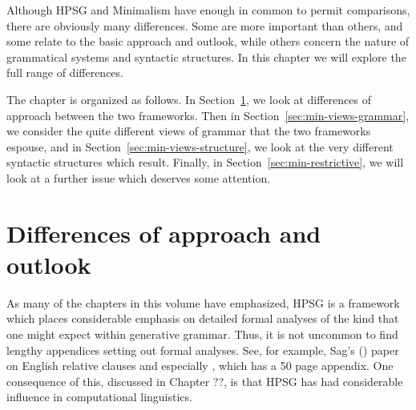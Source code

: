 \documentclass[output=paper]{langsci/langscibook}
\begin{document}
Although HPSG and Minimalism have enough in common to permit comparisons, there are obviously many differences. Some are more important than others, and some relate to the basic approach and outlook, while others concern the nature of grammatical systems and syntactic structures. In this chapter we will explore the full range of differences.

The chapter is organized as follows. In Section~\ref{sec:min-difference}, we look at differences of approach between the two frameworks. Then in Section~\ref{sec:min-views-grammar}, we consider the quite different views of grammar that the two frameworks espouse, and in Section~\ref{sec:min-views-structure}, we look at the very different syntactic structures which result. Finally, in Section~\ref{sec:min-restrictive}, we will look at a further issue which deserves some attention.

\section{Differences of approach and outlook}
\label{sec:min-difference}
As many of the chapters in this volume have emphasized, HPSG is a framework which places considerable emphasis on detailed formal analyses of the kind that one might expect within generative grammar. Thus, it is not uncommon to find lengthy appendices setting out formal analyses. See, for example, Sag's (\citeyear{Sag97a}) paper on English relative clauses and especially \citet{GSag2000a-u}, which has a 50 page appendix. One consequence of this, discussed in Chapter ??, is that HPSG has had considerable influence in computational linguistics.
\end{document}
